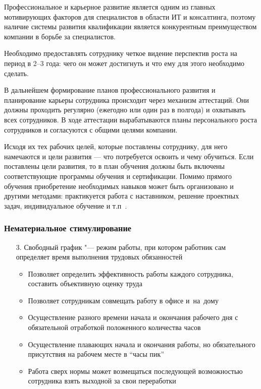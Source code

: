 \documentclass{../industrial-development}
\begin{document}
\lecturenotes

Профессиональное и карьерное развитие является одним из главных мотивирующих факторов для специалистов в области ИТ и консалтинга, поэтому наличие системы развития квалификации является конкурентным преимуществом компании в борьбе за специалистов.

Необходимо предоставлять сотруднику четкое видение перспектив роста на период в 2--3 года: чего он может достигнуть и что ему для этого необходимо сделать.

В дальнейшем формирование планов профессионального развития и планирование карьеры сотрудника происходит через механизм аттестаций. Они должны проходить регулярно (ежегодно или один раз в полгода) и охватывать всех сотрудников. В ходе аттестации вырабатываются планы персонального роста сотрудников и согласуются с общими целями компании.

Исходя их тех рабочих целей, которые поставлены сотруднику, для него намечаются и цели развития — что потребуется освоить и чему обучиться. Если поставлены цели развития, то в план обучения должны быть включены соответствующие программы обучения и сертификации. Помимо прямого обучения приобретение необходимых навыков может быть организовано и другими методами: практикуется работа с наставником, решение проектных задач, индивидуальное обучение и т.п~\cite{TriKitMotiv}.

\begin{frame} \frametitle{Нематериальное стимулирование}
        \begin{itemize}
	\item[3.] \alert{Свободный график} "--- режим работы, при котором работник сам определяет время выполнения трудовых обязанностей
			 \begin{itemize}
		\item Позволяет определить эффективность работы каждого сотрудника, составить объективную оценку труда
		\item Позволяет сотрудникам совмещать работу в офисе и~на~дому
		\item Осуществление разного времени начала и окончания рабочего дня с обязательной отработкой положенного количества часов
		\item Осуществление плавающих начала и окончания работы, но обязательного присутствия на рабочем месте в “часы пик”
		\item Работа сверх нормы может возмещаться последующей возможностью сотрудника взять выходной за свои переработки
  \end{itemize}
  \end{itemize}
\end{frame}
		
\end{document}
